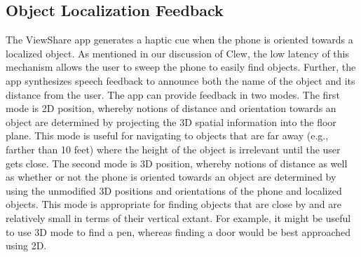 \documentclass[chi_draft]{sigchi}
\begin{document}
\subsection{Object Localization Feedback}
The ViewShare app generates a haptic cue when the phone is oriented towards a localized object.  As mentioned in our discussion of Clew, the low latency of this mechanism allows the user to sweep the phone to easily find objects.  Further, the app synthesizes speech feedback to announce both the name of the object and its distance from the user.  The app can provide feedback in two modes.  The first mode is 2D position, whereby notions of distance and orientation towards an object are determined by projecting the 3D spatial information into the floor plane.  This mode is useful for navigating to objects that are far away (e.g., farther than 10 feet) where the height of the object is irrelevant until the user gets close.  The second mode is 3D position, whereby notions of distance as well as whether or not the phone is oriented towards an object are determined by using the unmodified 3D positions and orientations of the phone and localized objects.  This mode is appropriate for finding objects that are close by and are relatively small in terms of their vertical extant.  For example, it might be useful to use 3D mode to find a pen, whereas finding a door would be best approached using 2D.
\end{document}
